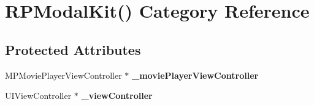\hypertarget{category_r_p_modal_kit_07_08}{\section{R\-P\-Modal\-Kit() Category Reference}
\label{category_r_p_modal_kit_07_08}
}
\subsection*{Protected Attributes}
\begin{DoxyCompactItemize}
\item 
\hypertarget{category_r_p_modal_kit_07_08_aa413693de63b4684a4f663746988948f}{M\-P\-Movie\-Player\-View\-Controller $\ast$ {\bfseries \-\_\-movie\-Player\-View\-Controller}}\label{category_r_p_modal_kit_07_08_aa413693de63b4684a4f663746988948f}

\item 
\hypertarget{category_r_p_modal_kit_07_08_aef36f74d2e0dfc009c2cf81d7ef40537}{U\-I\-View\-Controller $\ast$ {\bfseries \-\_\-view\-Controller}}\label{category_r_p_modal_kit_07_08_aef36f74d2e0dfc009c2cf81d7ef40537}

\end{DoxyCompactItemize}
